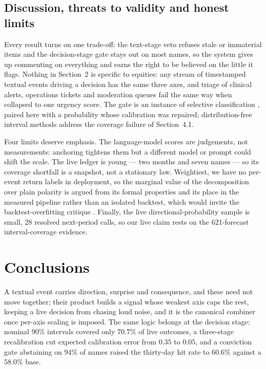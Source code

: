 \documentclass[12pt,a4paper]{article}
\begin{document}
\subsection{Discussion, threats to validity and honest limits}

Every result turns on one trade-off: the text-stage veto refuses stale or immaterial
items and the decision-stage gate stays out on most names, so the system gives up
commenting on everything and earns the right to be believed on the little it flags.
Nothing in Section~2 is specific to equities: any stream of timestamped textual
events driving a decision has the same three axes, and triage of clinical alerts,
operations tickets and moderation queues fail the same way when collapsed to one
urgency score. The gate is an instance of selective classification
\cite{chow1970,geifman2017}, paired here with a probability whose calibration was
repaired; distribution-free interval methods \cite{angelopoulos2021} address the
coverage failure of Section~4.1.

Four limits deserve emphasis. The language-model scores are judgements, not
measurements: anchoring tightens them but a different model or prompt could shift
the scale. The live ledger is young --- two months and seven names --- so its
coverage shortfall is a snapshot, not a stationary law. Weightiest, we have no
per-event return labels in deployment, so the marginal value of the decomposition
over plain polarity is argued from its formal properties and its place in the
measured pipeline rather than an isolated backtest, which would invite the
backtest-overfitting critique \cite{bailey2017}. Finally, the live
directional-probability sample is small, 28 resolved next-period calls, so our live
claim rests on the 621-forecast interval-coverage evidence.

\section{Conclusions}

A textual event carries direction, surprise and consequence, and these need not move
together; their product builds a signal whose weakest axis caps the rest, keeping a
live decision from chasing loud noise, and it is the canonical combiner once
per-axis scaling is imposed. The same logic belongs at the decision stage: nominal
$90\%$ intervals covered only $70.7\%$ of live outcomes, a three-stage recalibration
cut expected calibration error from $0.35$ to $0.05$, and a conviction gate
abstaining on $94\%$ of names raised the thirty-day hit rate to $60.6\%$ against a
$58.0\%$ base.
\end{document}
